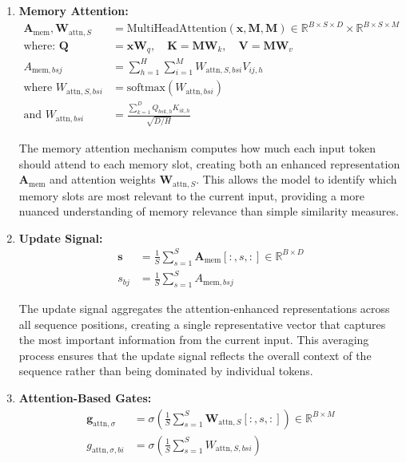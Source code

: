 \documentclass{article}
\begin{document}
\begin{enumerate}
\item \textbf{Memory Attention:}
\begin{align}
\mathbf{A}_{\text{mem}}, \mathbf{W}_{\text{attn},S} &= \text{MultiHeadAttention}(\mathbf{x}, \mathbf{M}, \mathbf{M}) \in \mathbb{R}^{B \times S \times D} \times \mathbb{R}^{B \times S \times M} \\
\text{where: } \mathbf{Q} &= \mathbf{x} \mathbf{W}_q, \quad \mathbf{K} = \mathbf{M} \mathbf{W}_k, \quad \mathbf{V} = \mathbf{M} \mathbf{W}_v \\
A_{\text{mem},bsj} &= \sum_{h=1}^{H} \sum_{i=1}^{M} W_{\text{attn},S,bsi} V_{ij,h} \\
\text{where } W_{\text{attn},S,bsi} &= \text{softmax}(W_{\text{attn},bsi}) \\
\text{and } W_{\text{attn},bsi} &= \frac{\sum_{k=1}^{D} Q_{bsk,h} K_{ik,h}}{\sqrt{D/H}}
\end{align}

The memory attention mechanism computes how much each input token should attend to each memory slot, creating both an enhanced representation $\mathbf{A}_{\text{mem}}$ and attention weights $\mathbf{W}_{\text{attn},S}$. This allows the model to identify which memory slots are most relevant to the current input, providing a more nuanced understanding of memory relevance than simple similarity measures.

\item \textbf{Update Signal:}
\begin{align}
\mathbf{s} &= \frac{1}{S}\sum_{s=1}^{S} \mathbf{A}_{\text{mem}}[:, s, :] \in \mathbb{R}^{B \times D} \\
s_{bj} &= \frac{1}{S}\sum_{s=1}^{S} A_{\text{mem},bsj}
\end{align}

The update signal aggregates the attention-enhanced representations across all sequence positions, creating a single representative vector that captures the most important information from the current input. This averaging process ensures that the update signal reflects the overall context of the sequence rather than being dominated by individual tokens.

\item \textbf{Attention-Based Gates:}
\begin{align}
\mathbf{g}_{\text{attn},\sigma} &= \sigma\left(\frac{1}{S}\sum_{s=1}^{S} \mathbf{W}_{\text{attn},S}[:, s, :]\right) \in \mathbb{R}^{B \times M} \\
g_{\text{attn},\sigma,bi} &= \sigma\left(\frac{1}{S}\sum_{s=1}^{S} W_{\text{attn},S,bsi}\right)
\end{align}


\end{enumerate}
\end{document}
